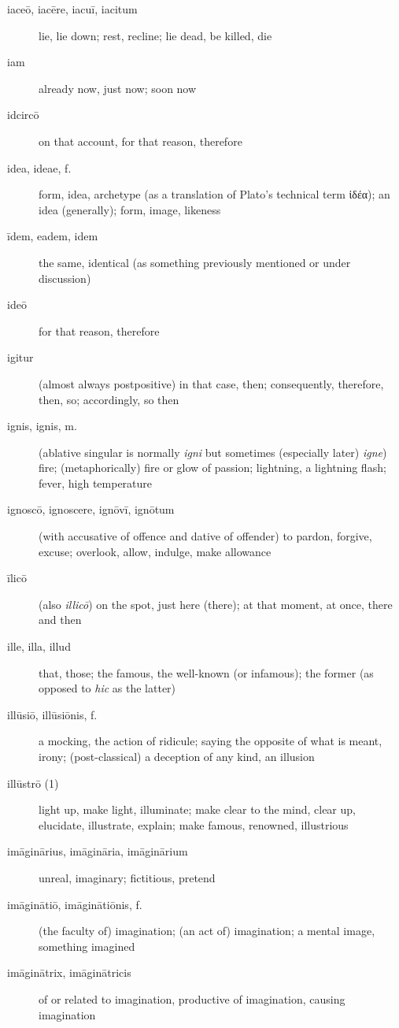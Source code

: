 \begin{description}
    \item[iaceō, iacēre, iacuī, iacitum] \marginnote{*}lie, lie down; rest, recline; lie dead, be killed, die
    \item[iam] \marginnote{*}already now, just now; soon now
    \item[idcircō] on that account, for that reason, therefore
    \item[idea, ideae, f.] form, idea, archetype (as a translation of Plato's technical term \textgreek{ἰδέα}); an idea (generally); form, image, likeness
    \item[īdem, eadem, idem] \marginnote{*}the same, identical (as something previously mentioned or under discussion)
    \item[ideō] \marginnote{*}for that reason, therefore
    \item[igitur] \marginnote{*}(almost always postpositive) in that case, then; consequently, therefore, then, so; accordingly, so then
    \item[ignis, ignis, m.] \marginnote{*}(ablative singular is normally \textit{igni} but sometimes (especially later) \textit{igne}) fire; (metaphorically) fire or glow of passion; lightning, a lightning flash; fever, high temperature
    \item[ignoscō, ignoscere, ignōvī, ignōtum] (with accusative of offence and dative of offender) to pardon, forgive, excuse; overlook, allow, indulge, make allowance
    \item[īlicō] (also \textit{illicō}) on the spot, just here (there); at that moment, at once, there and then
    \item[ille, illa, illud] \marginnote{*}that, those; the famous, the well-known (or infamous); the former (as opposed to \textit{hic} as the latter)
    \item[illūsiō, illūsiōnis, f.] a mocking, the action of ridicule; saying the opposite of what is meant, irony; (post-classical) a deception of any kind, an illusion
    \item[illūstrō (1)] light up, make light, illuminate; make clear to the mind, clear up, elucidate, illustrate, explain; make famous, renowned, illustrious
    \item[imāginārius, imāgināria, imāginārium] unreal, imaginary; fictitious, pretend
    \item[imāginātiō, imāginātiōnis, f.] (the faculty of) imagination; (an act of) imagination; a mental image, something imagined
    \item[imāginātrix, imāginātricis] of or related to imagination, productive of imagination, causing imagination

\end{description}
